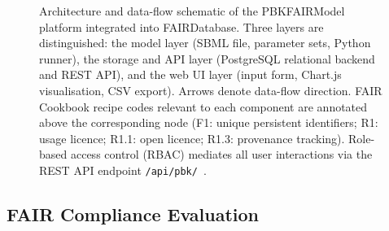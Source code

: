 \documentclass[preprint,12pt]{elsarticle}
\begin{document}
\begin{linenumbers}
\begin{figure}[htbp]
\caption{Architecture and data-flow schematic of the PBKFAIRModel platform
integrated into FAIRDatabase. Three layers are distinguished: the model layer
(SBML file, parameter sets, Python runner), the storage and API layer
(PostgreSQL relational backend and REST API), and the web UI layer
(input form, Chart.js visualisation, CSV export). Arrows denote data-flow
direction. FAIR Cookbook recipe codes relevant to each component are
annotated above the corresponding node (F1: unique persistent identifiers;
R1: usage licence; R1.1: open licence; R1.3: provenance tracking).
Role-based access control (RBAC) mediates all user interactions via the
REST API endpoint \texttt{/api/pbk/}~\cite{zhu2025fair}.}
\label{fig:architecture}
\end{figure}


\subsection{FAIR Compliance Evaluation} %

%
%


\end{linenumbers}
\end{document}

